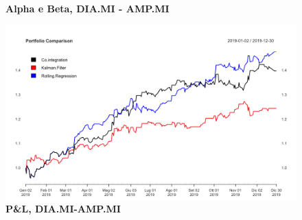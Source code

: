 \documentclass[]{article}
\begin{document}
\
\begin{figure}[htp]
	\begin{center}
		
		

		\caption{\textbf{Alpha e Beta, DIA.MI - AMP.MI}}
		
	\end{center}
\end{figure}


\begin{figure}
	\centering
	\includegraphics[scale=0.3]{dia_amp_portfolio.png}
	\caption{\textbf{P\&L, DIA.MI-AMP.MI}}
\end{figure}
\end{document}
